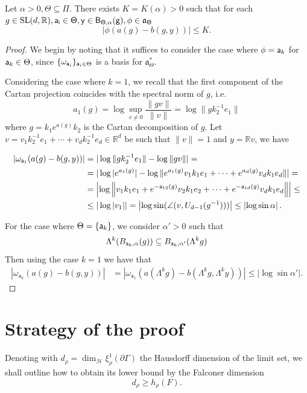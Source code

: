 \documentclass{report}
\begin{document}
\begin{lemma}\label{lem:busemann}
Let $\alpha > 0, \Theta \subseteq \Pi$.
There exists $K = K(\alpha) > 0$ such that for each $g \in \operatorname{{\mathrm{SL}}}(d, \mathbb R), \sf{a_i} \in \Theta, y \in B_{\Theta, \alpha}(g), \phi \in \mathfrak a_\Theta$
\[
    |\phi (a(g) - b(g, y))| \leq K.
\]
\end{lemma}\begin{proof}
We begin by noting that it suffices to consider the case where $\phi = {\sf a}_k$
for ${\sf a}_k \in \Theta$, since $\{ \omega_{\mathsf{a}_i} \}_{{\sf a}_i \in \Theta} $ 
is a basis for $\mathfrak a_\Theta^*$.

Considering the case where $k=1$, we recall that the first component of the Cartan projection coincides with the spectral norm of $g$, i.e.
\[
a_1(g) = \log \sup_{v \neq 0} \frac{\| g v\|}{\|v\|} = \log \|g k_2^{-1} e_1 \|
\] 
where $g = k_1 e^{a(g)} k_2$ is the Cartan decomposition of $g$.
Let $v = v_1 k_2^{-1} e_1 + \cdots + v_d k_2^{-1} e_d \in \mathbb R^d$ be such that $\|v\| = 1$ and $y = \mathbb R v$, we have

\begin{align*}
    |\omega_{\mathsf{a}_1}(a(g) - b(g, y))| &=
    |\log \|g k_2^{-1} e_1 \| - \log \|g v \| | =\\
    &= |\log |e^{a_1(g)}| - \log \| e^{a_1(g)} v_1 k_1 e_1 + \cdots + e^{a_d(g)} v_d k_1 e_d \| | =\\
    &= \left| \log \left\| v_1 k_1 e_1 + e^{-{\sf a}_{12}(g)} v_2 k_1 e_2 + \cdots
    +  e^{-{\sf a}_{1d}(g)} v_d k_1 e_d \right\| \right| \leq\\
    &\leq |\log |v_1| | = \left| \log \sin( \angle(v, U_{d-1}(g^{-1}))) \right| \leq \left| \log \sin \alpha \right|.
\end{align*}

For the case where $\Theta = \{ {\sf a}_k \}$, we consider $\alpha' > 0$ such that
\[
\Lambda^k (B_{{\sf a}_k, \alpha}(g)) \subseteq B_{{\sf a}_k, \alpha'}(\Lambda^k g)
\]
Then using the case $k=1$ we have that
\begin{align*}
    |\omega_{\mathsf{a}_k}(a(g) - b(g, y))| &=
    |\omega_{\mathsf{a}_1}(a(\Lambda^k g) - b(\Lambda^k g, \Lambda^k y))| \leq \left| \log \sin \alpha' \right| .
\end{align*}
\end{proof}

\section{Strategy of the proof}\label{sec:ProofStrategy}
Denoting with $d_\rho = \dim_{\mathcal H} \xi_\rho^1(\partial \Gamma)$ the Hausdorff  dimension of the limit set, we shall outline how to obtain its lower bound by the Falconer dimension
\[
    d_\rho \geq h_\rho(F).
\]
\end{document}
